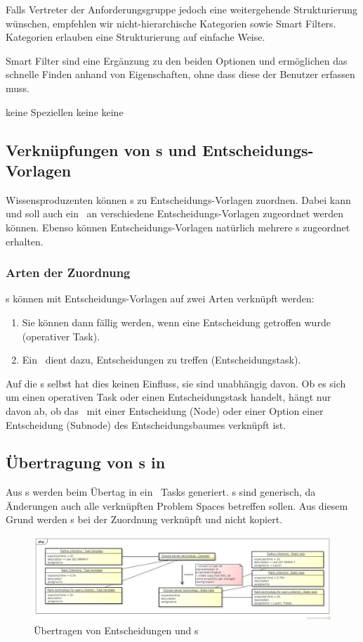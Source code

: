 {{				Falls Vertreter der Anforderungsgruppe jedoch eine weitergehende Strukturierung wünschen, 
				empfehlen wir nicht-hierarchische Kategorien sowie Smart Filters.
				Kategorien erlauben eine Strukturierung auf einfache Weise. 

				Smart Filter sind eine Ergänzung zu den beiden Optionen und ermöglichen das schnelle Finden anhand von Eigenschaften,
				ohne dass diese der Benutzer erfassen muss.
			}
			{keine Speziellen}
			{keine}
			{keine}
		}
		
		
		\subsection{Verknüpfungen von \ttpl s und Entscheidungs-Vorlagen}
			Wissensproduzenten können \ttpl s zu Entscheidungs-Vorlagen zuordnen.
			Dabei kann und soll auch ein \ttpl\ an verschiedene Entscheidungs-Vorlagen zugeordnet werden können.
			Ebenso können Entscheidungs-Vorlagen natürlich mehrere \ttpl s zugeordnet erhalten.
			
			\subsubsection{Arten der Zuordnung}
				\ttpl s können mit Entscheidungs-Vorlagen auf zwei Arten verknüpft werden:
				\begin{enumerate}
					\item Sie können dann fällig werden, wenn eine Entscheidung getroffen wurde (operativer Task).
					\item Ein \ttpl\ dient dazu, Entscheidungen zu treffen (Entscheidungstask).
				\end{enumerate}
				Auf die \ttpl s selbst hat dies keinen Einfluss, sie sind unabhängig davon. 
				Ob es sich um einen operativen Task oder einen Entscheidungstask handelt, hängt nur davon ab,
				ob das \ttpl\ mit einer Entscheidung (Node) oder einer Option einer Entscheidung (Subnode) des Entscheidungsbaumes verknüpft ist.

			\subsection{Übertragung von \ttpl s in \ppt}
				Aus \ttpl s werden beim Übertag in ein \ppt\ Tasks generiert.
				\ttpl s sind generisch, da Änderungen auch alle verknüpften Problem Spaces betreffen sollen.
				Aus diesem Grund werden \ttpl s bei der Zuordnung verknüpft und nicht kopiert.
				
				\begin{figure}[H]
					\includegraphics[width=\textwidth]{architecture/media/img/decisionTaskRelation.png}
					\centering
					\caption{Übertragen von Entscheidungen und \ttpl s}
					\label{fig:DecisionTaskRelation}
				\end{figure}
				

